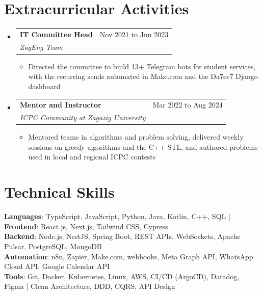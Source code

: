\documentclass[letterpaper,11pt]{article}
\makeatletter
\newcommand{\resumeItem}[1]{
  \item\small{
    {#1 \vspace{-3pt}}
  }
}
\newcommand{\resumeSubheading}[4]{
  \vspace{-1pt}\item
    \begin{tabular*}{0.97\textwidth}[t]{l@{\extracolsep{\fill}}r}
      \textbf{#1} & #2 \\
      \textit{\small#3} & \textit{\small #4} \\
    \end{tabular*}\vspace{-9pt}
}
\newcommand{\resumeSubHeadingListStart}{\begin{itemize}[leftmargin=0.15in, label={}]}
\newcommand{\resumeSubHeadingListEnd}{\end{itemize}}
\newcommand{\resumeItemListStart}{\begin{itemize}}
\newcommand{\resumeItemListEnd}{\end{itemize}\vspace{-7pt}}
\makeatother
\begin{document}
\section{Extracurricular Activities}
    \resumeSubHeadingListStart
      \resumeSubheading
        {IT Committee Head}{Nov 2021 to Jun 2023}
        {ZagEng Team}{}
        \resumeItemListStart
            \resumeItem{Directed the committee to build 13+ Telegram bots for student services, with the recurring sends automated in Make.com and the Da7ee7 Django dashboard}
            \resumeItemListEnd
      \resumeSubheading
        {Mentor and Instructor}{Mar 2022 to Aug 2024}
        {ICPC Community at Zagazig University}{}
        \resumeItemListStart
            \resumeItem{Mentored teams in algorithms and problem solving, delivered weekly sessions on greedy algorithms and the C++ STL, and authored problems used in local and regional ICPC contests}
        \resumeItemListEnd
    \resumeSubHeadingListEnd


\section{Technical Skills}

    \begin{itemize}[leftmargin=0.15in, label={}]
        \small{\item{
        
        \textbf{Languages}{: TypeScript, JavaScript, Python, Java, Kotlin, C++, SQL | \textbf{Frontend}{: React.js, Next.js, Tailwind CSS, Cypress}} \\
        
        \textbf{Backend}{: Node.js, NestJS, Spring Boot, REST APIs, WebSockets, Apache Pulsar, PostgreSQL, MongoDB} \\

        \textbf{Automation}{: n8n, Zapier, Make.com, webhooks, Meta Graph API, WhatsApp Cloud API, Google Calendar API} \\
        
        \textbf{Tools}{: Git, Docker, Kubernetes, Linux, AWS, CI/CD (ArgoCD), Datadog, Figma | Clean Architecture, DDD, CQRS, API Design}
        
        }}
    \end{itemize}


\end{document}
